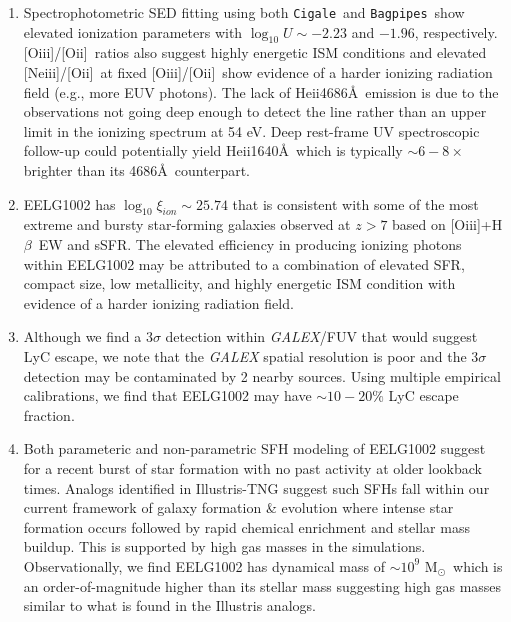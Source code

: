 \documentclass[twocolumn,tight,times,linenumbers]{aastex631}
\newcommand{\hbeta}{H$\beta$}
\newcommand{\heii}{He{\sc ii}}
\newcommand{\oii}{[O{\sc ii}]}
\newcommand{\oiii}{[O{\sc iii}]}
\newcommand{\neiii}{[Ne{\sc iii}]}
\newcommand{\msol}{M$_\odot$}
\newcommand{\xiion}{$\xi_{ion}$}
\newcommand{\cigale}{\texttt{Cigale}}
\newcommand{\bagpipes}{\texttt{Bagpipes}}
\begin{document}
\begin{enumerate}[nolistsep,label=(\roman*)]
			\item Spectrophotometric SED fitting using both \cigale~and \bagpipes~show elevated ionization parameters with $\log_{10} U \sim -2.23$ and $-1.96$, respectively. \oiii/\oii~ratios also suggest highly energetic ISM conditions and elevated \neiii/\oii~at fixed \oiii/\oii~show evidence of a harder ionizing radiation field (e.g., more EUV photons).  The lack of \heii4686\AA~emission is due to the observations not going deep enough to detect the line rather than an upper limit in the ionizing spectrum at 54 eV. Deep rest-frame UV spectroscopic follow-up could potentially yield \heii1640\AA~which is typically $\sim 6 - 8 \times$ brighter than its 4686\AA~counterpart.
			
			\item EELG1002 has $\log_{10} \textrm{\xiion} \sim 25.74$ that is consistent with some of the most extreme and bursty star-forming galaxies observed at $z > 7$ based on \oiii+\hbeta~EW and sSFR. The elevated efficiency in producing ionizing photons within EELG1002 may be attributed to a combination of elevated SFR, compact size, low metallicity, and highly energetic ISM condition with evidence of a harder ionizing radiation field. 
			
			\item Although we find a $3\sigma$ detection within \textit{GALEX}/FUV that would suggest LyC escape, we note that the \textit{GALEX} spatial resolution is poor and the $3\sigma$ detection may be contaminated by 2 nearby sources. Using multiple empirical calibrations, we find that EELG1002 may have $\sim 10 - 20\%$ LyC escape fraction.

			\item Both parameteric and non-parametric SFH modeling of EELG1002 suggest for a recent burst of star formation with no past activity at older lookback times. Analogs identified in Illustris-TNG suggest such SFHs fall within our current framework of galaxy formation \& evolution where intense star formation occurs followed by rapid chemical enrichment and stellar mass buildup. This is supported by high gas masses in the simulations. Observationally, we find EELG1002 has dynamical mass of $\sim 10^9$ \msol~which is an order-of-magnitude higher than its stellar mass suggesting high gas masses similar to what is found in the Illustris analogs.
		\end{enumerate}
		
\end{document}
